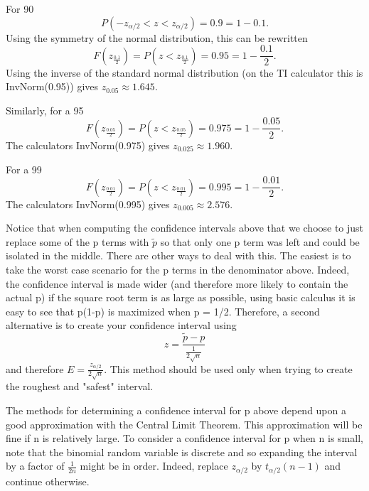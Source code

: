 \documentclass[10pt,]{book}
\numberwithin{equation}{section}
\newcommand{\lt}{<}
\begin{document}
%
\par
\hypertarget{p-1346}{}%
For 90%
\begin{equation*}
P( -z_{ \alpha/2} \lt z \lt z_{ \alpha/2}) = 0.9 = 1 - 0.1 .
\end{equation*}
Using the symmetry of the normal distribution, this can be rewritten%
\begin{equation*}
F(z_{ \frac{0.1}{2}}) = P( z \lt z_{ \frac{0.1}{2}}) = 0.95 = 1 - \frac{0.1}{2} .
\end{equation*}
Using the inverse of the standard normal distribution (on the TI calculator this is InvNorm(0.95)) gives \(z_{ 0.05} \approx 1.645\).%
\par
\hypertarget{p-1347}{}%
Similarly, for a 95 %
\begin{equation*}
F(z_{ \frac{0.05}{2}}) = P( z \lt z_{ \frac{0.05}{2}}) = 0.975 = 1 - \frac{0.05}{2} .
\end{equation*}
The calculators InvNorm(0.975) gives \(z_{ 0.025} \approx 1.960\).%
\par
\hypertarget{p-1348}{}%
For a 99 %
\begin{equation*}
F(z_{ \frac{0.01}{2}}) = P( z \lt z_{ \frac{0.01}{2}}) = 0.995 = 1 - \frac{0.01}{2} .
\end{equation*}
The calculators InvNorm(0.995) gives \(z_{ 0.005} \approx 2.576\).%
\par
\hypertarget{p-1349}{}%
Notice that when computing the confidence intervals above that we choose to just replace some of the p terms with \(\tilde{p}\) so that only one p term was left and could be isolated in the middle. There are other ways to deal with this. The easiest is to take the worst case scenario for the p terms in the denominator above. Indeed, the confidence interval is made wider (and therefore more likely to contain the actual p) if the square root term is as large as possible, using basic calculus it is easy to see that p(1-p) is maximized when p = 1/2. Therefore, a second alternative is to create your confidence interval using%
\begin{equation*}
z = \frac{\tilde{p} - p}{\frac{1}{2\sqrt{n}}}
\end{equation*}
and therefore \(E = \frac{z_{ \alpha/2}}{2\sqrt{n}}\). This method should be used only when trying to create the roughest and "safest" interval.%
\par
\hypertarget{p-1350}{}%
The methods for determining a confidence interval for p above depend upon a good approximation with the Central Limit Theorem. This approximation will be fine if n is relatively large. To consider a confidence interval for p when n is small, note that the binomial random variable is discrete and so expanding the interval by a factor of \(\frac{1}{2n}\) might be in order. Indeed, replace \(z_{\alpha/2}\) by \(t_{\alpha/2}(n-1)\) and continue otherwise.%
\end{document}
